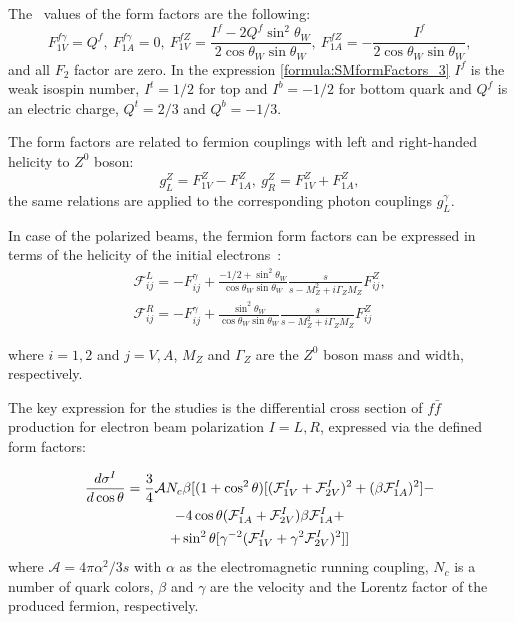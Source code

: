 The \sm\ values of the form factors are the following:
\begin{equation}
F^{f\gamma}_{1V} = Q^{f}, \ F^{f\gamma}_{1A} = 0, \ F^{fZ}_{1V} = \frac{I^f - 2Q^f\sin^2\theta_W}{2\cos\theta_W\sin\theta_W}, \ F^{fZ}_{1A} = - \frac{I^f}{2\cos\theta_W\sin\theta_W},
\label{formula:SMformFactors_3}
\end{equation}
and all $F_2$ factor are zero. In the expression \ref{formula:SMformFactors_3} $I^f$ is the weak isospin number, $I^t = 1/2$ for top and $I^b = -1/2$ for bottom quark and $Q^f$ is an electric charge, $Q^t = 2/3$ and $Q^b = -1/3$.

The form factors are related to fermion couplings with left and right-handed helicity to $Z^0$ boson:
\begin{equation}
g_L^Z = F_{1V}^Z - F_{1A}^Z, \  g_R^Z = F_{1V}^Z + F_{1A}^Z, 
\label{formula:EWcouplings_3}
\end{equation}
the same relations are applied to the corresponding photon couplings $g^\gamma_L$.

In case of the polarized beams, the fermion form factors can be expressed in terms of the helicity of the initial electrons~\cite{bib:Schmidt}:
\begin{eqnarray}
\mathcal{F}^L_{ij} = - F^\gamma_{ij} +  \frac{-1/2 + \sin^2\theta_W}{\cos\theta_W\sin\theta_W}\frac{s}{s-M^2_Z+i\Gamma_ZM_Z}F^Z_{ij},\\
\mathcal{F}^R_{ij} = - F^\gamma_{ij} +  \frac{\sin^2\theta_W}{\cos\theta_W\sin\theta_W}\frac{s}{s-M^2_Z+i\Gamma_ZM_Z}F^Z_{ij}    
\end{eqnarray}

where $i=1,2$ and $j=V,A$, $M_Z$ and $\Gamma_Z$ are the $Z^0$ boson mass and width, respectively.

The key expression for the studies is the differential cross section of $f\bar{f}$ production for electron beam polarization $I=L,R$, expressed via the defined form factors:

\begin{multline}
\label{formula:DiffSigma_3}
\frac{d\sigma^I}{d\cos\theta} = \frac{3}{4} \mathcal{A} N_c \beta[ (1+\cos^2\theta) [(\mathcal{F}^I_{1V}+\mathcal{F}^I_{2V})^2+(\beta \mathcal{F}^I_{1A})^2] - \\-4 \cos\theta (\mathcal{F}^I_{1A}+\mathcal{F}^I_{2V})\beta \mathcal{F}^I_{1A} +\\+ \sin^2\theta [\gamma ^{-2} (\mathcal{F}^I_{1V} +\gamma^2 \mathcal{F}^I_{2V})^2] ]
\end{multline}
where $\mathcal{A} = 4\pi\alpha^2/3s$ with $\alpha$ as the electromagnetic running coupling, $N_c$ is a number of quark colors, $\beta$ and $\gamma$ are the velocity and the Lorentz factor of the produced fermion, respectively. 

